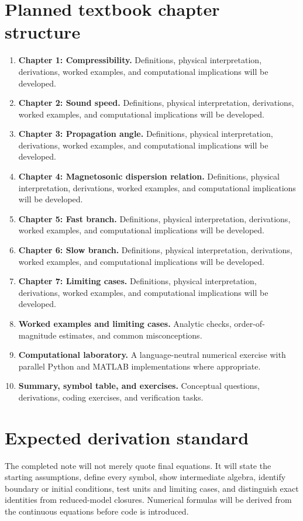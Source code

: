 \documentclass[11pt]{article}
\begin{document}
\section{Planned textbook chapter structure}
\begin{enumerate}[leftmargin=1.8em]
\item \textbf{Chapter 1: Compressibility.} Definitions, physical interpretation, derivations, worked examples, and computational implications will be developed.
\item \textbf{Chapter 2: Sound speed.} Definitions, physical interpretation, derivations, worked examples, and computational implications will be developed.
\item \textbf{Chapter 3: Propagation angle.} Definitions, physical interpretation, derivations, worked examples, and computational implications will be developed.
\item \textbf{Chapter 4: Magnetosonic dispersion relation.} Definitions, physical interpretation, derivations, worked examples, and computational implications will be developed.
\item \textbf{Chapter 5: Fast branch.} Definitions, physical interpretation, derivations, worked examples, and computational implications will be developed.
\item \textbf{Chapter 6: Slow branch.} Definitions, physical interpretation, derivations, worked examples, and computational implications will be developed.
\item \textbf{Chapter 7: Limiting cases.} Definitions, physical interpretation, derivations, worked examples, and computational implications will be developed.
\item \textbf{Worked examples and limiting cases.} Analytic checks, order-of-magnitude estimates, and common misconceptions.
\item \textbf{Computational laboratory.} A language-neutral numerical exercise with parallel Python and MATLAB implementations where appropriate.
\item \textbf{Summary, symbol table, and exercises.} Conceptual questions, derivations, coding exercises, and verification tasks.
\end{enumerate}

\section{Expected derivation standard}
The completed note will not merely quote final equations. It will state the starting assumptions, define every symbol, show intermediate algebra, identify boundary or initial conditions, test units and limiting cases, and distinguish exact identities from reduced-model closures. Numerical formulas will be derived from the continuous equations before code is introduced.
\end{document}
